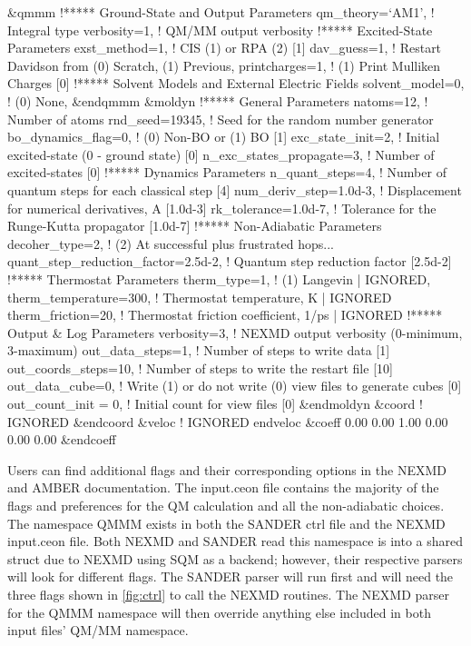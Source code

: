 \lstset{frame=single}
\begin{mylisting}
&qmmm
    !***** Ground-State and Output Parameters
    qm_theory=`AM1', ! Integral type 
    verbosity=1, ! QM/MM output verbosity
    !***** Excited-State Parameters
    exst_method=1, ! CIS (1) or RPA (2) [1]
    dav_guess=1, ! Restart Davidson from (0) Scratch, (1) Previous,
    printcharges=1, ! (1) Print Mulliken Charges [0]
    !***** Solvent Models and External Electric Fields
    solvent_model=0, ! (0) None,
&endqmmm
&moldyn
    !***** General Parameters
    natoms=12, ! Number of atoms
    rnd_seed=19345, ! Seed for the random number generator bo_dynamics_flag=0, ! (0) Non-BO or (1) BO [1]
    exc_state_init=2, ! Initial excited-state (0 - ground state) [0]
    n_exc_states_propagate=3, ! Number of excited-states [0]
    !***** Dynamics Parameters
    n_quant_steps=4, ! Number of quantum steps for each classical step [4]
    num_deriv_step=1.0d-3, ! Displacement for numerical derivatives, A [1.0d-3]
    rk_tolerance=1.0d-7, ! Tolerance for the Runge-Kutta propagator [1.0d-7]
    !***** Non-Adiabatic Parameters
    decoher_type=2, ! (2) At successful plus frustrated hops...
    quant_step_reduction_factor=2.5d-2, ! Quantum step reduction factor [2.5d-2]
    !***** Thermostat Parameters
    therm_type=1, ! (1) Langevin | IGNORED,
    therm_temperature=300, ! Thermostat temperature, K | IGNORED
    therm_friction=20, ! Thermostat friction coefficient, 1/ps | IGNORED
    !***** Output & Log Parameters
    verbosity=3, ! NEXMD output verbosity (0-minimum, 3-maximum)
    out_data_steps=1, ! Number of steps to write data [1]
    out_coords_steps=10, ! Number of steps to write the restart file [10]
    out_data_cube=0, ! Write (1) or do not write (0) view files to generate cubes [0]
    out_count_init = 0, ! Initial count for view files [0]
&endmoldyn
&coord
    ! IGNORED
&endcoord
&veloc
    ! IGNORED
endveloc
&coeff
    0.00 0.00
    1.00 0.00
    0.00 0.00
&endcoeff
\end{mylisting}
\bigskip

Users can find additional flags and their corresponding options in the
NEXMD and AMBER documentation. The input.ceon file contains the
majority of the flags and preferences for the QM calculation and all
the non-adiabatic choices. The namespace QMMM exists in both the SANDER
ctrl file and the NEXMD input.ceon file. Both NEXMD and SANDER read
this namespace is into a shared struct due to NEXMD using SQM as a
backend; however, their respective parsers will look for different
flags. The SANDER parser will run first and will need the three flags
shown in \ref{fig:ctrl} to call the NEXMD routines. The NEXMD parser
for the QMMM namespace will then override anything else included in
both input files’ QM/MM namespace.

